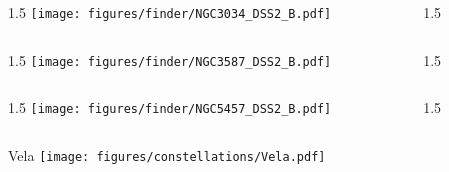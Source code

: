 \documentclass[final]{beamer}
\newlength{\colwidth}
\begin{document}

\begin{frame}[t]{}
    \begin{columns}[T]
        \begin{column}{1.5\colwidth}
            \centering
            \texttt{[image: figures/finder/NGC3034\_DSS2\_B.pdf]}
        \end{column}
        \begin{column}{1.5\colwidth}
            \Large
            
        \end{column}
    \end{columns}
    \vspace{\fill}
    \begin{columns}[T]
        \begin{column}{1.5\colwidth}
            \centering
            \texttt{[image: figures/finder/NGC3587\_DSS2\_B.pdf]}
        \end{column}
        \begin{column}{1.5\colwidth}
            \Large
            
        \end{column}
    \end{columns}
\end{frame}


\begin{frame}[t]{}
    \begin{columns}[T]
        \begin{column}{1.5\colwidth}
            \centering
            \texttt{[image: figures/finder/NGC5457\_DSS2\_B.pdf]}
        \end{column}
        \begin{column}{1.5\colwidth}
            \Large
            
        \end{column}
    \end{columns}
    \vspace{\fill}
\end{frame}


\begin{frame}[t]{\LARGE Vela}
    \centering
    \texttt{[image: figures/constellations/Vela.pdf]}
\end{frame}
\end{document}
